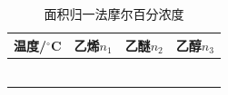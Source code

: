 \documentclass[a4paper]{article}
\begin{document}
\begin{table}[H]
	\begin{center}
		\begin{tabular}{l|l|l|l}
			\hline
			温度/$^\circ$C &乙烯$n_{1}$      &乙醚$n_{2}$  &乙醇$n_{3}$\\ 
			\hline
			&             &          &              \\
			\hline
			&             &          &              \\
			\hline
			&             &          &              \\
			\hline
			&             &          &              \\
			\hline
			&             &          &              \\
			\hline
			&             &          &              \\
			\hline
		 \end{tabular}
	\end{center}
	\caption{面积归一法摩尔百分浓度}
\end{table}
\end{document}
